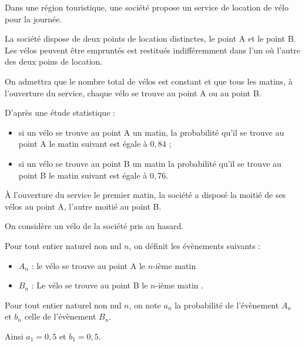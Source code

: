 Dans une région touristique, une société propose un service de location de vélo pour la journée.

\smallskip

La société dispose de deux points de location distinctes, le point A et le point B. Les vélos peuvent être empruntés est restitués indifféremment dans l'un où l'autre des deux poins de location.

\smallskip

On admettra que le nombre total de vélos est constant et que tous les matins, à l'ouverture du service, chaque vélo se trouve au point A ou au point B.

\smallskip

D'après une étude statistique :

\begin{itemize}[leftmargin=*]
	\item si un vélo se trouve au point A un matin, la probabilité qu'il se trouve au point A le matin suivant est égale à $0,84$ ;
	\item si un vélo se trouve au point B un matin la probabilité qu'il se trouve au point B le matin suivant est égale à $0,76$.
\end{itemize}

À l'ouverture du service le premier matin, la société a disposé la moitié de ses vélos au point A, l'autre moitié au point B.

\smallskip

On considère un vélo de la société pris au hasard.

\smallskip

Pour tout entier naturel non nul $n$, on définit les évènements suivants :

\begin{itemize}
	\item $A_n$ : \og le vélo se trouve au point A le $n$-ième matin \fg{}
	\item $B_n$ : \og Le vélo se trouve au point B le $n$-ième matin \fg.
\end{itemize}

Pour tout entier naturel non nul $n$, on note $a_n$ la probabilité de l'évènement $A_n$ et $b_n$ celle de l'évènement $B_n$.

Ainsi $a_1 = 0,5$ et $b_1 =  0,5$.

